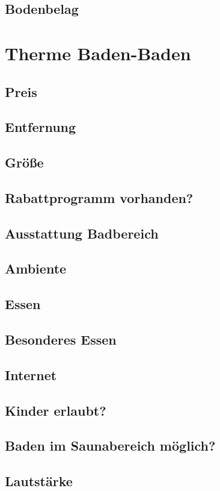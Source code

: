 \documentclass{article}
\begin{document}
\subsection*{Bodenbelag}

\section*{Therme Baden-Baden}
\subsection*{Preis}
\subsection*{Entfernung}
\subsection*{Größe}
\subsection*{Rabattprogramm vorhanden?}
\subsection*{Ausstattung Badbereich}
\subsection*{Ambiente}
\subsection*{Essen}
\subsection*{Besonderes Essen}
\subsection*{Internet}
\subsection*{Kinder erlaubt?}
\subsection*{Baden im Saunabereich möglich?}
\subsection*{Lautstärke}
\end{document}
